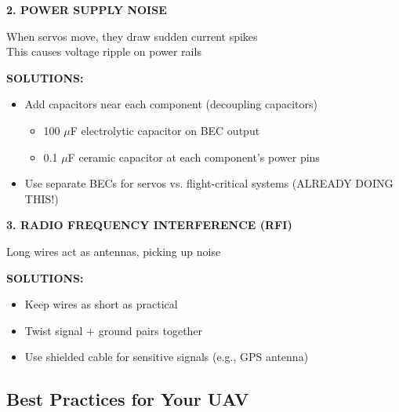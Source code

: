 \documentclass[11pt,letterpaper]{article}
\begin{document}
\textbf{2. POWER SUPPLY NOISE}

When servos move, they draw sudden current spikes\\
This causes voltage ripple on power rails

\textbf{SOLUTIONS:}
\begin{itemize}
\item Add capacitors near each component (decoupling capacitors)
\begin{itemize}
\item 100 $\mu$F electrolytic capacitor on BEC output
\item 0.1 $\mu$F ceramic capacitor at each component's power pins
\end{itemize}
\item Use separate BECs for servos vs. flight-critical systems (ALREADY DOING THIS!)
\end{itemize}

\textbf{3. RADIO FREQUENCY INTERFERENCE (RFI)}

Long wires act as antennas, picking up noise

\textbf{SOLUTIONS:}
\begin{itemize}
\item Keep wires as short as practical
\item Twist signal + ground pairs together
\item Use shielded cable for sensitive signals (e.g., GPS antenna)
\end{itemize}

\subsection{Best Practices for Your UAV}
\end{document}
